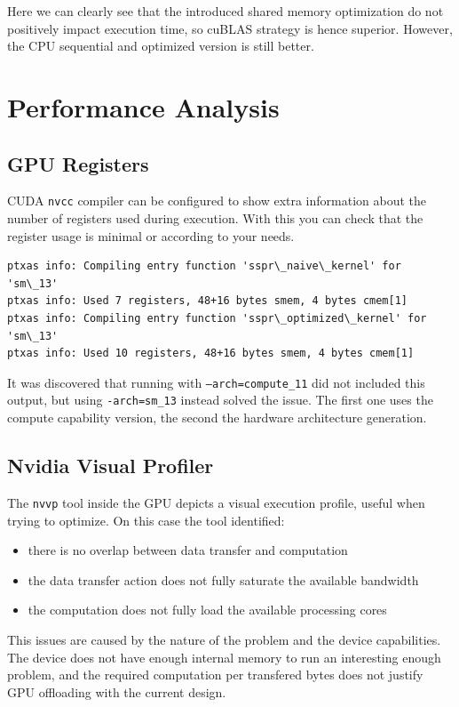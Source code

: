 \documentclass{llncs}
\begin{document}
Here we can clearly see that the introduced shared memory optimization do not positively impact execution time,
so cuBLAS strategy is hence superior. However, the CPU sequential and optimized version is still better.

\section{Performance Analysis}

\subsection{GPU Registers}

CUDA {\tt nvcc} compiler can be configured to show extra information about the number of registers used during execution. With this you can check that the register usage is minimal or according to your needs.

\begin{verbatim}
ptxas info: Compiling entry function 'sspr\_naive\_kernel' for 'sm\_13'
ptxas info: Used 7 registers, 48+16 bytes smem, 4 bytes cmem[1]
ptxas info: Compiling entry function 'sspr\_optimized\_kernel' for 'sm\_13'
ptxas info: Used 10 registers, 48+16 bytes smem, 4 bytes cmem[1]
\end{verbatim}

It was discovered that running with {\tt --arch=compute\_11} did not included this output,
but using {\tt -arch=sm\_13} instead solved the issue. 
The first one uses the compute capability version, the second the hardware architecture generation.

\subsection{Nvidia Visual Profiler}

The {\tt nvvp} tool inside the GPU depicts a visual execution profile, useful when trying to optimize.
On this case the tool identified:

\begin{itemize}
\item there is no overlap between data transfer and computation
\item the data transfer action does not fully saturate the available bandwidth
\item the computation does not fully load the available processing cores
\end{itemize}

This issues are caused by the nature of the problem and the device capabilities.
The device does not have enough internal memory to run an interesting enough problem,
and the required computation per transfered bytes does not justify GPU offloading with the current design.
\end{document}
